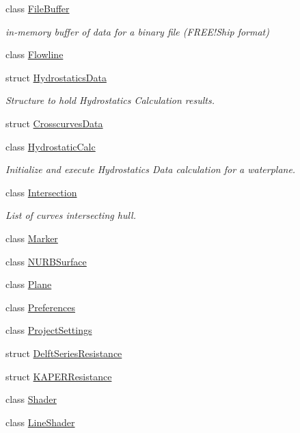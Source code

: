 \begin{DoxyCompactItemize}
\item 
class \hyperlink{classShipCAD_1_1FileBuffer}{File\-Buffer}
\begin{DoxyCompactList}\small\item\em in-\/memory buffer of data for a binary file (F\-R\-E\-E!\-Ship format) \end{DoxyCompactList}\item 
class \hyperlink{classShipCAD_1_1Flowline}{Flowline}
\item 
struct \hyperlink{structShipCAD_1_1HydrostaticsData}{Hydrostatics\-Data}
\begin{DoxyCompactList}\small\item\em Structure to hold Hydrostatics Calculation results. \end{DoxyCompactList}\item 
struct \hyperlink{structShipCAD_1_1CrosscurvesData}{Crosscurves\-Data}
\item 
class \hyperlink{classShipCAD_1_1HydrostaticCalc}{Hydrostatic\-Calc}
\begin{DoxyCompactList}\small\item\em Initialize and execute Hydrostatics Data calculation for a waterplane. \end{DoxyCompactList}\item 
class \hyperlink{classShipCAD_1_1Intersection}{Intersection}
\begin{DoxyCompactList}\small\item\em List of curves intersecting hull. \end{DoxyCompactList}\item 
class \hyperlink{classShipCAD_1_1Marker}{Marker}
\item 
class \hyperlink{classShipCAD_1_1NURBSurface}{N\-U\-R\-B\-Surface}
\item 
class \hyperlink{classShipCAD_1_1Plane}{Plane}
\item 
class \hyperlink{classShipCAD_1_1Preferences}{Preferences}
\item 
class \hyperlink{classShipCAD_1_1ProjectSettings}{Project\-Settings}
\item 
struct \hyperlink{structShipCAD_1_1DelftSeriesResistance}{Delft\-Series\-Resistance}
\item 
struct \hyperlink{structShipCAD_1_1KAPERResistance}{K\-A\-P\-E\-R\-Resistance}
\item 
class \hyperlink{classShipCAD_1_1Shader}{Shader}
\item 
class \hyperlink{classShipCAD_1_1LineShader}{Line\-Shader}
\item 

\end{DoxyCompactItemize}
